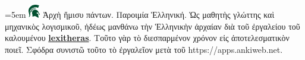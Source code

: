 


    \font=5em \includegraphics[width=5mm]{icon.png} Ἀρχὴ ἥμισυ πάντων. Παροιμία Ἑλληνική. Ὡς μαθητὴς γλώττης καὶ μηχανικὸς λογισμικοῦ, ἡδέως μανθάνω τὴν Ἑλληνικὴν ἀρχαίαν διὰ τοῦ ἐργαλείου τοῦ καλουμένου \href{https://github.com/conorreid/lexitheras}{\textbf{\Poppins lexitheras}}. Τοῦτο γὰρ τὸ διεσπαρμένον χρόνον εἰς ἀποτελεσματικὸν ποιεῖ. Σφόδρα συνιστῶ τοῦτο τὸ ἐργαλεῖον μετὰ τοῦ {\Poppins https://apps.ankiweb.net}.

